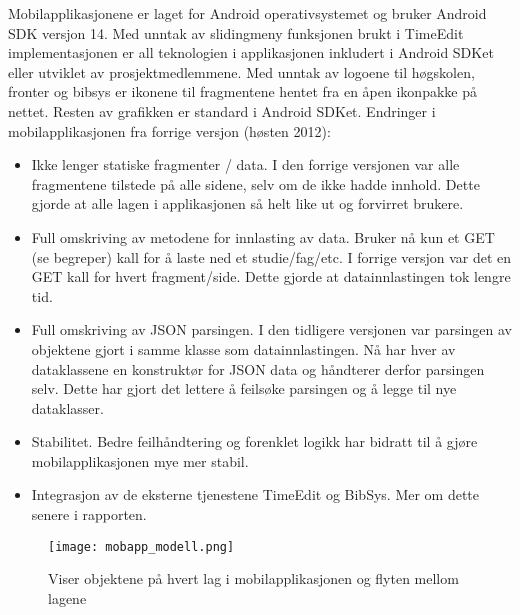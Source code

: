 \documentclass[../main.tex]{subfiles}
\begin{document}
Mobilapplikasjonene er laget for Android operativsystemet og bruker Android SDK versjon 14. Med unntak av slidingmeny funksjonen brukt i TimeEdit implementasjonen er all teknologien i applikasjonen inkludert i Android SDKet eller utviklet av prosjektmedlemmene. Med unntak av logoene til høgskolen, fronter og bibsys er ikonene til fragmentene hentet fra en åpen ikonpakke på nettet. Resten av grafikken er standard i Android SDKet.\newline
\newline
Endringer i mobilapplikasjonen fra forrige versjon (høsten 2012):
\begin{itemize}
\item Ikke lenger statiske fragmenter / data. I den forrige versjonen var alle fragmentene tilstede på alle sidene, selv om de ikke hadde innhold. Dette gjorde at alle lagen i applikasjonen så helt like ut og forvirret brukere.
\item Full omskriving av metodene for innlasting av data. Bruker nå kun et GET (se begreper) kall for å laste ned et studie/fag/etc. I forrige versjon var det en GET kall for hvert fragment/side. Dette gjorde at datainnlastingen tok lengre tid.
\item Full omskriving av JSON parsingen. I den tidligere versjonen var parsingen av objektene gjort i samme klasse som datainnlastingen. Nå har hver av dataklassene en konstruktør for JSON data og håndterer derfor parsingen selv. Dette har gjort det lettere å feilsøke parsingen og å legge til nye dataklasser.
\item Stabilitet. Bedre feilhåndtering og forenklet logikk har bidratt til å gjøre mobilapplikasjonen mye mer stabil.
\item Integrasjon av de eksterne tjenestene TimeEdit og BibSys. Mer om dette senere i rapporten.
\end{itemize}

\begin{figure}[H]
  \centering
  \texttt{[image: mobapp\_modell.png]}
  \caption{Viser objektene på hvert lag i mobilapplikasjonen og flyten mellom lagene}
\end{figure}
\end{document}
